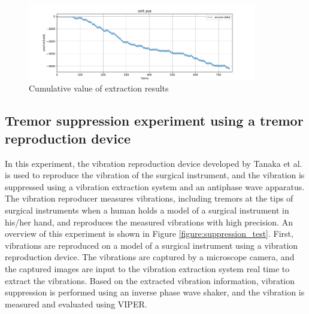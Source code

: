\begin{figure}[tb]
  \centering
  \includegraphics[width = 10cm,pagebox=cropbox,clip]{img/drift_plot.pdf}
  \caption{Cumulative value of extraction results}
  \label{figure:drift_plot}
\end{figure}




\subsection{ Tremor suppression experiment using a tremor reproduction device}\label{subsection:suppression_experiment}




In this experiment, the vibration reproduction device developed by Tanaka et al.\cite{bib:tremor_reproduction_eng}
is used to reproduce the vibration of the surgical instrument,
and the vibration is suppressed using a vibration extraction system and
an antiphase wave apparatus. The vibration reproducer measures vibrations,
including tremors at the tips of surgical instruments when a human holds a model of a surgical instrument in his/her hand,
and reproduces the measured vibrations with high precision. An overview of this experiment is shown in Figure \ref{figure:suppression_test}.
First, vibrations are reproduced on a model of a surgical instrument using a vibration reproduction device. The vibrations are captured by a microscope camera, and the captured images are input to the vibration extraction system real time to extract the vibrations. Based on the extracted vibration information, vibration suppression is performed using an inverse phase wave shaker, and the vibration is measured and evaluated using VIPER.




